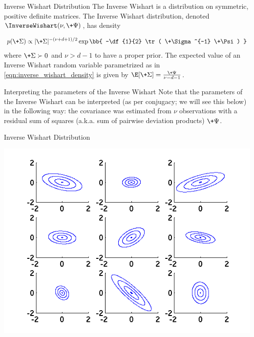 \documentclass[10pt]{beamer}
\begin{document}
\begin{frame}{Inverse Wishart Distribution}
The Inverse Wishart is a distribution on symmetric,  positive definite matrices.     The Inverse Wishart distribution,  denoted $\InverseWishart(\nu, \+\Psi)$,  has density

\begin{align}
p(\+\Sigma) \propto | \+\Sigma|^{-(\nu+d +1) /2}  \exp \bb{ -\df{1}{2} \tr ( \+\Sigma^{-1} \+\Psi) } 
\label{eqn:inverse_wishart_density}
\end{align}
where $\+\Sigma \succ 0$ and $\nu > d-1$ to have a proper prior.     The expected value of an Inverse Wishart random variable parametrized as in \eqref{eqn:inverse_wishart_density} is given by $\E[\+\Sigma] = \frac{\+\Psi}{\nu -d -1}$.   

\begin{block}{Interpreting the parameters of the Inverse Wishart}
Note that the parameters of the Inverse Wishart can be interpreted {\tiny (as per conjugacy; we will see this below) } in the following way: the covariance was estimated from $\nu$ observations with a residual sum of squares (a.k.a.  sum of pairwise deviation products) $\+\Psi$. 
 \end{block}

\end{frame}

\begin{frame}{Inverse Wishart Distribution}

\vfill 
\begin{center}
\includegraphics[width=.7\textwidth]{images/inverse_wishart_samples}
\end{center}
\vfill 
{}

\end{frame}
\end{document}
